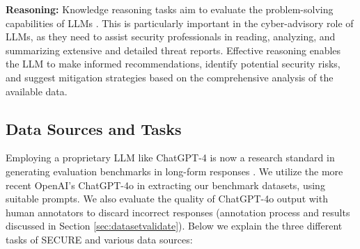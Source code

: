 \documentclass[conference]{IEEEtran}
\begin{document}
\textbf{Reasoning:} Knowledge reasoning tasks aim to evaluate the problem-solving capabilities of LLMs \cite{cao2022kqa}. This is particularly important in the cyber-advisory role of LLMs, as they need to assist security professionals in reading, analyzing, and summarizing extensive and detailed threat reports. Effective reasoning enables the LLM to make informed recommendations, identify potential security risks, and suggest mitigation strategies based on the comprehensive analysis of the available data.

\subsection{Data Sources and Tasks}\label{sec:datasourcetask}

Employing a proprietary LLM like ChatGPT-4 \cite{gpt4} is now a research standard in generating evaluation benchmarks in long-form responses \cite{yu2023kola, kim2023prometheus, zheng2024judging}. We utilize the more recent OpenAI's ChatGPT-4o \cite{gpt4o} in extracting our benchmark datasets, using suitable prompts. We also evaluate the quality of ChatGPT-4o output with human annotators to discard incorrect responses (annotation process and results discussed in Section \ref{sec:datasetvalidate}). Below we explain the three different tasks of SECURE and various data sources:
\end{document}
